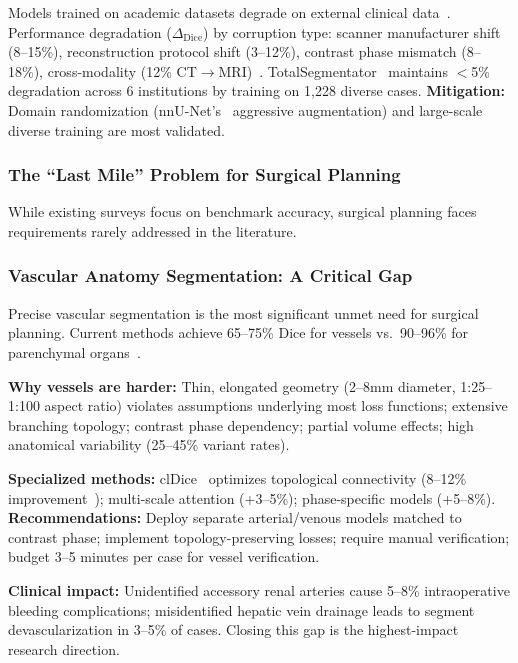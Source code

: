 \documentclass[conference]{IEEEtran}
\begin{document}
Models trained on academic datasets degrade on external clinical data~\cite{tajbakhsh2020embracing}. Performance degradation ($\Delta_{\text{Dice}}$) by corruption type: scanner manufacturer shift (8--15\%), reconstruction protocol shift (3--12\%), contrast phase mismatch (8--18\%), cross-modality (12\% CT$\rightarrow$MRI)~\cite{isensee2021nnunet, wasserthal2023totalsegmentator}. TotalSegmentator~\cite{wasserthal2023totalsegmentator} maintains $<$5\% degradation across 6 institutions by training on 1,228 diverse cases. \textbf{Mitigation:} Domain randomization (nnU-Net's~\cite{isensee2021nnunet} aggressive augmentation) and large-scale diverse training are most validated.

\subsubsection{The ``Last Mile'' Problem for Surgical Planning}

While existing surveys focus on benchmark accuracy, surgical planning faces requirements rarely addressed in the literature.

\subsubsection{Vascular Anatomy Segmentation: A Critical Gap}
\label{sec:vascular}

Precise vascular segmentation is the most significant unmet need for surgical planning. Current methods achieve 65--75\% Dice for vessels vs.\ 90--96\% for parenchymal organs~\cite{shit2021cldice, wasserthal2023totalsegmentator}.

\textbf{Why vessels are harder:} Thin, elongated geometry (2--8mm diameter, 1:25--1:100 aspect ratio) violates assumptions underlying most loss functions; extensive branching topology; contrast phase dependency; partial volume effects; high anatomical variability (25--45\% variant rates).

\textbf{Specialized methods:} clDice~\cite{shit2021cldice} optimizes topological connectivity (8--12\% improvement~\cite{shit2021cldice}); multi-scale attention (+3--5\%); phase-specific models (+5--8\%). \textbf{Recommendations:} Deploy separate arterial/venous models matched to contrast phase; implement topology-preserving losses; require manual verification; budget 3--5 minutes per case for vessel verification.

\textbf{Clinical impact:} Unidentified accessory renal arteries cause 5--8\% intraoperative bleeding complications; misidentified hepatic vein drainage leads to segment devascularization in 3--5\% of cases. Closing this gap is the highest-impact research direction.
\end{document}

